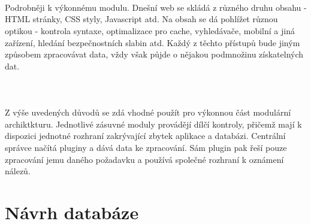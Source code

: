 \documentclass[10pt]{article}
\begin{document}
\paragraph{~}Podrobn\v{e}ji k v\'ykonn\'emu modulu. Dne\v{s}n\'i web se skl\'ad\'a z r\r{u}zn\'eho druhu obsahu - HTML str\'anky, CSS styly, Javascript atd. Na obsah se d\'a pohl\'i\v{z}et r\r{u}znou optikou - kontrola syntaxe, optimalizace pro cache, vyhled\'ava\v{c}e, mobiln\'i a jin\'a za\v{r}\'izen\'i, hled\'an\'i bezpe\v{c}nostn\'ich slabin atd. Ka\v{z}d\'y z t\v{e}chto p\v{r}\'istup\r{u} bude jin\'ym zp\r{u}sobem zpracov\'avat data, v\v{z}dy v\v{s}ak p\r{u}jde o n\v{e}jakou podmno\v{z}inu z\'iskateln\'ych dat. 
\paragraph{~}Z v\'y\v{s}e uveden\'ych d\r{u}vod\r{u} se zd\'a vhodn\'e pou\v{z}\'it pro v\'ykonnou \v{c}\'ast modul\'arn\'i archiktkturu. Jednotliv\'e z\'asuvn\'e moduly prov\'ad\v{e}j\'i d\'il\v{c}\'i kontroly, p\v{r}i\v{c}em\v{z} maj\'i k dispozici jednotn\'e rozhran\'i zakr\'yvaj\'ic\'i zbytek aplikace a datab\'azi. Centr\'aln\'i spr\'avce na\v{c}\'it\'a pluginy a d\'av\'a data ke zpracov\'an\'i. S\'am plugin pak \v{r}e\v{s}\'i pouze zpracov\'an\'i jemu dan\'eho po\v{z}adavku a pou\v{z}\'iv\'a spole\v{c}n\'e rozhran\'i k ozn\'amen\'i n\'alez\r{u}.
\section{N\'avrh datab\'aze}
\end{document}

